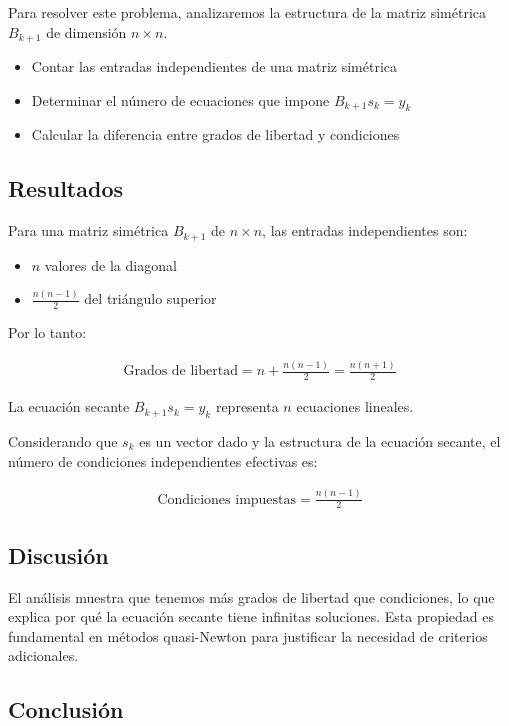 \documentclass{article}
\begin{document}
Para resolver este problema, analizaremos la estructura de la matriz simétrica $B_{k+1}$ de dimensión $n \times n$.

\begin{itemize}
    \item Contar las entradas independientes de una matriz simétrica
    \item Determinar el número de ecuaciones que impone $B_{k+1} s_k = y_k$
    \item Calcular la diferencia entre grados de libertad y condiciones
\end{itemize}

\subsection{Resultados}
\setcounter{equation}{0}

Para una matriz simétrica $B_{k+1}$ de $n \times n$, las entradas independientes son: 
\begin{itemize}
    \item $n$ valores de la diagonal
    \item $\frac{n(n-1)}{2}$ del triángulo superior
\end{itemize}

Por lo tanto:

\begin{align}
    \text{Grados de libertad} = n + \frac{n(n-1)}{2} = \frac{n(n+1)}{2}
\end{align}

La ecuación secante $B_{k+1} s_k = y_k$ representa $n$ ecuaciones lineales.

Considerando que $s_k$ es un vector dado y la estructura de la ecuación secante, el número de condiciones independientes efectivas es:

\begin{align}
    \text{Condiciones impuestas} = \frac{n(n-1)}{2}
\end{align}

\subsection{Discusión}

El análisis muestra que tenemos más grados de libertad que condiciones, lo que explica por qué la ecuación secante tiene infinitas soluciones. Esta propiedad es fundamental en métodos quasi-Newton para justificar la necesidad de criterios adicionales.

\subsection{Conclusión}
\end{document}
